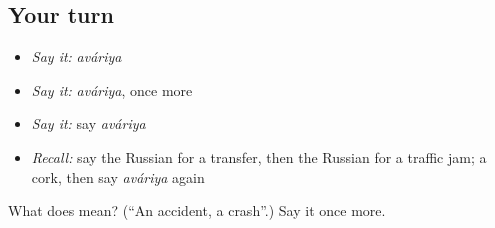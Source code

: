 \subsection*{Your turn}
\begin{itemize}
\raggedright
  \item \emph{Say it:} \emph{aváriya}
  \item \emph{Say it:} \emph{aváriya}, once more
  \item \emph{Say it:} say \emph{aváriya}
  \item \emph{Recall:} say the Russian for a transfer, then the Russian for a traffic jam; a cork, then say \emph{aváriya} again
\end{itemize}

\begin{tcolorbox}[breakable,colback=teal!4,colframe=teal!35!black,title={Before you move on}]
What does  mean? (\textquotedblleft{}An accident, a crash\textquotedblright{}.) Say it once more.
\end{tcolorbox}
